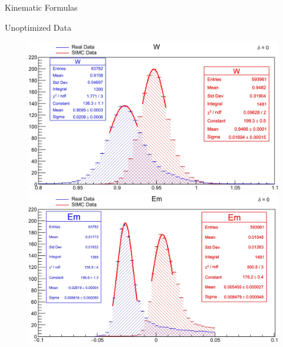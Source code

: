 \documentclass[final]{beamer}
\newlength{\colwidth}
\begin{document}
\begin{frame}[t]
\begin{columns}[t]
\begin{column}{\colwidth}
\begin{block}{Kinematic Formulas}
  \end{block}
\vspace{-.75cm}
\begin{block}{Unoptimized Data}

\begin{figure}
  \centering

  \begin{minipage}[t]{0.49\textwidth}
    \includegraphics[width=\linewidth]{uncalibrated data/W_0.jpg}
  \end{minipage}
  \hfill
  \begin{minipage}[t]{0.5\textwidth}
    \includegraphics[width=\linewidth]{uncalibrated data/Em_0.jpg}
  \end{minipage}

  \vspace{0cm}  %


\end{figure}
\end{block}
\end{column}
\end{columns}
\end{frame}
\end{document}

